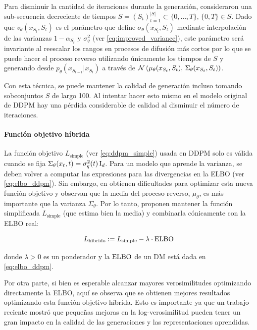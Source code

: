 Para disminuir la cantidad de iteraciones durante la generación, consideraron una sub-secuencia decreciente de tiempos $S=(S_t)_{t=1}^{|S|}\subset\{0,\ldots,T\},\,\{0,T\}\in S$. Dado que $v_\theta(x_{S_t},S_t)$ es el parámetro que define $\sigma_\theta(x_{S_t},S_t)$ mediante interpolación de las varianzas $1-\alpha_{S_t}$ y $\sigma_q^2$ (ver \eqref{eq:improved_variance}), este parámetro será invariante al reescalar los rangos en procesos de difusión más cortos por lo que se puede hacer el proceso reverso utilizando únicamente los tiempos de $S$ y generando desde $p_\theta(x_{S_{t-1}}|x_{S_t})$ a través de $\mathcal{N}\left(\mu_\theta(x_{S_t}, S_t),\,\Sigma_\theta(x_{S_t}, S_t)\right)$.

Con esta técnica, se puede mantener la calidad de generación incluso tomando sobconjuntos $S$ de largo 100. Al intentar hacer esto mismo en el modelo original de DDPM hay una pérdida considerable de calidad al disminuir el número de iteraciones.

\paragraph{Función objetivo híbrida}

La función objetivo $L_{\text{simple}}$ (ver \eqref{eq:ddpm_simple}) usada en DDPM solo es válida cuando se fija $\Sigma_\theta(x_t,t) = \sigma_q^2(t)\operatorname{I}_{d}$. Para un modelo que aprende la varianza, se deben volver a computar las expresiones para las divergencias en la ELBO (ver \eqref{eq:elbo_ddpm}). Sin embargo, en \cite{nichol2021improved} obtienen dificultades para optimizar esta nueva función objetivo y observan que la media del proceso reverso, $\mu_\theta$, es más importante que la varianza $\Sigma_\theta$. Por lo tanto, proponen mantener la función simplificada $L_{\text{simple}}$ (que estima bien la media) y combinarla cónicamente con la ELBO real:

\begin{equation}
    L_{\text{híbrido}} := L_{\text{simple}} - \lambda\cdot\operatorname{ELBO}
\end{equation}

donde $\lambda>0$ es un ponderador y la $\operatorname{ELBO}$ de un DM está dada en \eqref{eq:elbo_ddpm}.

Por otra parte, si bien es esperable alcanzar mayores verosimilitudes optimizando directamente la ELBO, aquí se observa que se obtienen mejores resultados optimizando esta función objetivo híbrida. Esto es importante ya que un trabajo reciente mostró que pequeñas mejoras en la log-verosimilitud pueden tener un gran impacto en la calidad de las generaciones y las representaciones aprendidas.

